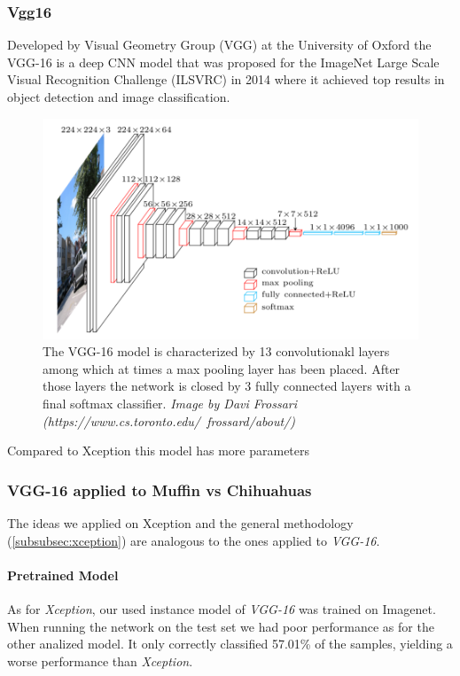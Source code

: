 \subsubsection{Vgg16}\label{subsubsec:vgg16}
Developed by Visual Geometry Group (VGG) at the University of Oxford the VGG-16\cite{simonyan2015deep} is a deep CNN model that
was proposed for the ImageNet Large Scale Visual Recognition Challenge (ILSVRC) in 2014 where it achieved top results in object detection and image classification.

\begin{figure}[h]
    \includegraphics[scale=0.7]{imgs/vgg_arch}
    \caption{
        The VGG-16 model is characterized by 13 convolutionakl layers among which at times a max pooling layer has been placed.
        After those layers the network is closed by 3 fully connected layers with a final softmax classifier.
        \textit{Image by Davi Frossari (https://www.cs.toronto.edu/~frossard/about/)}
    }\label{fig:vgg16}
\end{figure}

Compared to Xception this model has more parameters

\subsubsection{VGG-16 applied to Muffin vs Chihuahuas}
The ideas we applied on Xception and the general methodology (\ref{subsubsec:xception}) are analogous to the ones
applied to \textit{VGG-16}.


\paragraph{Pretrained Model}
As for \textit{Xception}, our used instance model of \textit{VGG-16} was trained on Imagenet.
When running the network on the test set we had poor performance as for the other analized model.
It only correctly classified 57.01\% of the samples, yielding a worse performance than \textit{Xception}.

